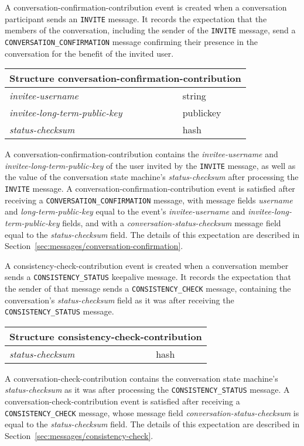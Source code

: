 \documentclass{article}
\def\message#1{\texttt{#1}}
\def\field#1{\textit{#1}}
\def\smfield#1{\textsl{#1}}
\def\type#1{\textsf{#1}}
\newenvironment{struct}[1]{
\newcommand{\structfield}[2]{
\smfield{##1} & \type{##2} \\
\hline
}
\par
\vspace{-\medskipamount}
\hspace{2em minus 2em}\begin{tabular}{|l|l|}
\hline
\multicolumn{2}{|c|}{Structure \type{#1}} \\
\hline
\hline
}{
\end{tabular}
\vspace{-\medskipamount}
\par
}
\begin{document}
A \type{conversation-confirmation-contribution} event is created when a conversation participant sends an \message{INVITE} message.
It records the expectation that the members of the conversation, including the sender of the \message{INVITE} message, send a \message{CONVERSATION\_CONFIRMATION} message confirming their presence in the conversation for the benefit of the invited user.
\begin{struct}{conversation-confirmation-contribution}
\structfield{invitee-username}{string}
\structfield{invitee-long-term-public-key}{publickey}
\structfield{status-checksum}{hash}
\end{struct}
A \type{conversation-confirmation-contribution} contains the \smfield{invitee-username} and \smfield{invitee-long-term-public-key} of the user invited by the \message{INVITE} message, as well as the value of the conversation state machine's \smfield{status-checksum} after processing the \message{INVITE} message.
A \type{conversation-confirmation-contribution} event is satisfied after receiving a \message{CONVERSATION\_CONFIRMATION} message, with message fields \field{username} and \field{long-term-public-key} equal to the event's \smfield{invitee-username} and \smfield{invitee-long-term-public-key} fields, and with a \field{conversation-status-checksum} message field equal to the \smfield{status-checksum} field.
The details of this expectation are described in Section~\ref{sec:messages/conversation-confirmation}.

A \type{consistency-check-contribution} event is created when a conversation member sends a \message{CONSISTENCY\_STATUS} keepalive message.
It records the expectation that the sender of that message sends a \message{CONSISTENCY\_CHECK} message, containing the conversation's \smfield{status-checksum} field as it was after receiving the \message{CONSISTENCY\_STATUS} message.
\begin{struct}{consistency-check-contribution}
\structfield{status-checksum}{hash}
\end{struct}
A \type{conversation-check-contribution} contains the conversation state machine's \smfield{status-checksum} as it was after processing the \message{CONSISTENCY\_STATUS} message.
A \type{conversation-check-contribution} event is satisfied after receiving a \message{CONSISTENCY\_CHECK} message, whose message field \field{conversation-status-checksum} is equal to the \smfield{status-checksum} field.
The details of this expectation are described in Section~\ref{sec:messages/consistency-check}.
\end{document}
